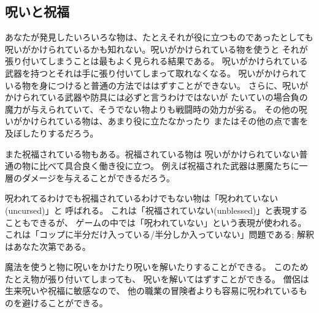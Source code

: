 \subsection*{呪いと祝福}

あなたが発見したいろいろな物は、たとえそれが役に立つものであったとしても
呪いがかけられているかも知れない。呪いがかけられている物を使うと
それが張り付いてしまうことは最もよく見られる結果である。
呪いがかけられている武器を持つとそれは手に張り付いてしまって取れなくなる。
呪いがかけられている物を身につけると普通の方法でははずすことができない。
さらに、呪いがかけられている武器や防具には必ずと言うわけではないが
たいていの場合負の魔力が与えられていて、そうでない物よりも戦闘時の効力が劣る。
その他の呪いがかけられている物は、あまり役に立たなかったり
またはその他の点で害を及ぼしたりするだろう。

また祝福されている物もある。祝福されている物は
呪いがかけられていない普通の物に比べて具合良く働き役に立つ。
例えば祝福された武器は悪魔たちに一層のダメージを与えることができるだろう。

呪われてるわけでも祝福されているわけでもない物は「呪われていない(uncursed)」と
呼ばれる。
これは「祝福されていない(unblessed)」と表現することもできるが、
ゲームの中では「呪われていない」という表現が使われる。
これは「コップに半分だけ入っている/半分しか入っていない」問題である;
解釈はあなた次第である。

魔法を使うと物に呪いをかけたり呪いを解いたりすることができる。
このためたとえ物が張り付いてしまっても、
呪いを解いてはずすことができる。
僧侶は生来呪いや祝福に敏感なので、
他の職業の冒険者よりも容易に呪われているものを避けることができる。

